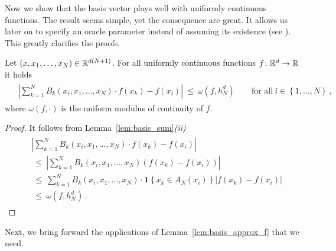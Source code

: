 %
Now we show that the basis vector plays well with uniformly continuous functions. The result seems simple, yet the consequence are great. It allows us later on to specify an oracle parameter instead of assuming its existence (see \cite[Assumption~1.6]{Wang2019}). This greatly clarifies the proofs.
\begin{lemma}
  \label{lem:basis_approx_f}
  Let $(x,x_1,\ldots,x_N)\in\mathbb{R}^{d(N+1)}$.
  For all uniformly continuous functions $f\colon \mathbb{R}^d\to \mathbb{R}$ it holds
 \begin{align*}
   \begin{split}
   &
   \left|
  \sum_{k=1}^{N}
    B_k(x_i,x_1,\ldots,x_N)\cdot 
    f(x_k)
    -
    f(x_i)
   \right|
   \ 
   \le
   \ 
   \omega
   \left(
    f,h_N^d
   \right)
   \qquad
   \text{for all}\ 
   i\in \left\{ 1,\ldots,N \right\}
   \,,
   \end{split}
 \end{align*}
 where $\omega(f,\cdot)$ is the uniform modulus of continuity of $f$. 
\end{lemma}
\begin{proof}
  It follows from Lemma~\ref{lem:basis_sum}\textit{(ii)}
  \begin{align*}
   \begin{split}
   &
   \left|
  \sum_{k=1}^{N}
    B_k(x_i,x_1,\ldots,x_N)\cdot 
    f(x_k)
    -
    f(x_i)
   \right|
   \\
   &
   \ 
   \le
   \ 
   \left|
  \sum_{k=1}^{N}
    B_k(x_i,x_1,\ldots,x_N)
    \left(
    f(x_k)
    -
    f(x_i)
    \right)
   \right|
   \\
   &
   \ 
   \le
   \ 
  \sum_{k=1}^{N}
    B_k(x_i,x_1,\ldots,x_N)
    \cdot
    \mathbf{1}\left\{
      x_k\in A_N(x_i)
    \right\}
    \left|
    f(x_k)
    -
    f(x_i)
    \right|
   \\
   &
   \ 
   \le
   \ 
   \omega
   \left(
    f,h_N^d
   \right)
   \,.
   \end{split}
 \end{align*}
\end{proof}
Next, we bring forward the applications of Lemma~\ref{lem:basis_approx_f} that we need.
